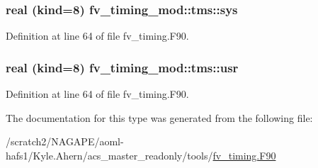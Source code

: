 \subsubsection[{sys}]{\setlength{\rightskip}{0pt plus 5cm}real (kind=8) fv\-\_\-timing\-\_\-mod\-::tms\-::sys}\label{structfv__timing__mod_1_1tms_a59dd213f4d775f1dec2c09b15eac0f07}


Definition at line 64 of file fv\-\_\-timing.\-F90.

\subsubsection[{usr}]{\setlength{\rightskip}{0pt plus 5cm}real (kind=8) fv\-\_\-timing\-\_\-mod\-::tms\-::usr}\label{structfv__timing__mod_1_1tms_ab3e73d47d65260a7e032e6800def553d}


Definition at line 64 of file fv\-\_\-timing.\-F90.



The documentation for this type was generated from the following file\-:\begin{DoxyCompactItemize}
\item 
/scratch2/\-N\-A\-G\-A\-P\-E/aoml-\/hafs1/\-Kyle.\-Ahern/acs\-\_\-master\-\_\-readonly/tools/\hyperlink{fv__timing_8F90}{fv\-\_\-timing.\-F90}\end{DoxyCompactItemize}
